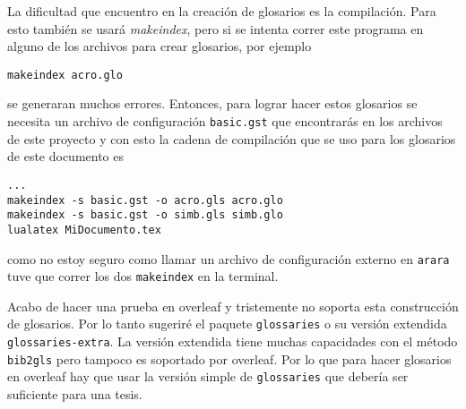 La dificultad que encuentro en la creación de glosarios es la compilación.
Para esto también se usará \textit{makeindex}, pero si se intenta correr
este programa en alguno de los archivos para crear glosarios, por ejemplo
\begin{flushleft}
  \verb|makeindex acro.glo|
\end{flushleft}
se generaran muchos errores. Entonces, para lograr hacer estos glosarios se
necesita un archivo de configuración \texttt{basic.gst} que encontrarás en
los archivos de este proyecto y con esto la cadena de compilación que se uso para los glosarios de este documento es
\begin{flushleft}
  \verb|...|\\
  \verb|makeindex -s basic.gst -o acro.gls acro.glo|\\
  \verb|makeindex -s basic.gst -o simb.gls simb.glo|\\
  \verb|lualatex MiDocumento.tex|
\end{flushleft}
como no estoy seguro como llamar un archivo de configuración externo en
\texttt{arara} tuve que correr los dos \texttt{makeindex} en la terminal.

Acabo de hacer una prueba en overleaf y tristemente no soporta esta
construcción  de glosarios. Por lo tanto sugeriré el paquete
\texttt{glossaries} o su versión extendida \texttt{glossaries-extra}. La
versión extendida tiene muchas capacidades con el método \texttt{bib2gls} pero
tampoco es soportado por overleaf. Por lo que para hacer glosarios en overleaf
hay que usar la versión simple de \texttt{glossaries} que debería ser
suficiente para una tesis.

